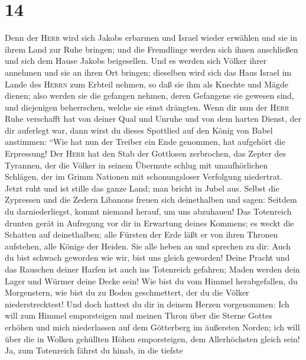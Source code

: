 \hypertarget{section-13}{%
\section{14}\label{section-13}}

 Denn der \textsc{Herr} wird sich Jakobs erbarmen und
Israel wieder erwählen und sie in ihrem Land zur Ruhe bringen; und die
Fremdlinge werden sich ihnen anschließen und sich dem Hause Jakobs
beigesellen.  Und es werden sich Völker ihrer annehmen und
sie an ihren Ort bringen; dieselben wird sich das Haus Israel im Lande
des \textsc{Herrn} zum Erbteil nehmen, so daß sie ihm als Knechte und
Mägde dienen; also werden sie die gefangen nehmen, deren Gefangene sie
gewesen sind, und diejenigen beherrschen, welche sie einst drängten.
 Wenn dir nun der \textsc{Herr} Ruhe verschafft hat von
deiner Qual und Unruhe und von dem harten Dienst, der dir auferlegt war,
 dann wirst du dieses Spottlied auf den König von Babel
anstimmen: ``Wie hat nun der Treiber ein Ende genommen, hat aufgehört
die Erpressung!  Der \textsc{Herr} hat den Stab der
Gottlosen zerbrochen, das Zepter des Tyrannen,  der die
Völker in seinem Übermute schlug mit unaufhörlichen Schlägen, der im
Grimm Nationen mit schonungsloser Verfolgung niedertrat. 
Jetzt ruht und ist stille das ganze Land; man bricht in Jubel aus.
 Selbst die Zypressen und die Zedern Libanons freuen sich
deinethalben und sagen: Seitdem du darniederliegst, kommt niemand
herauf, um uns abzuhauen!  Das Totenreich drunten gerät in
Aufregung vor dir in Erwartung deines Kommens; es weckt die Schatten auf
deinethalben; alle Fürsten der Erde läßt er von ihren Thronen aufstehen,
alle Könige der Heiden.  Sie alle heben an und sprechen
zu dir: Auch du bist schwach geworden wie wir, bist uns gleich geworden!
 Deine Pracht und das Rauschen deiner Harfen ist auch ins
Totenreich gefahren; Maden werden dein Lager und Würmer deine Decke
sein!  Wie bist du vom Himmel herabgefallen, du
Morgenstern, wie bist du zu Boden geschmettert, der du die Völker
niederstrecktest!  Und doch hattest du dir in deinem
Herzen vorgenommen: Ich will zum Himmel emporsteigen und meinen Thron
über die Sterne Gottes erhöhen und mich niederlassen auf dem Götterberg
im äußersten Norden;  ich will über die in Wolken
gehüllten Höhen emporsteigen, dem Allerhöchsten gleich sein!
 Ja, zum Totenreich fährst du hinab, in die tiefste
